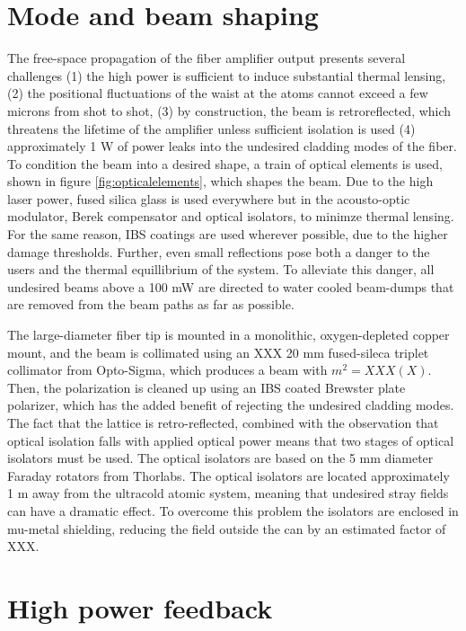 \documentclass[twocolumn,aps,pra,showpacs,preprintnumbers,bibnotes]{revtex4-1}
\begin{document}
\section{Mode and beam shaping}
The free-space propagation of the fiber amplifier output presents several challenges (1) the high power is sufficient to induce substantial thermal lensing, (2) the positional fluctuations of the waist at the atoms cannot exceed 
a few microns from shot to shot, (3) by construction, the beam is retroreflected, which threatens the lifetime of the amplifier unless sufficient isolation is used (4) approximately 1 W of power leaks into the undesired cladding modes of the fiber. 
To condition the beam into a desired shape, a train of optical elements is used, shown in figure \ref{fig:opticalelements}, which shapes the beam. 
Due to the high laser power, fused silica glass is used everywhere but in the acousto-optic modulator, Berek compensator and optical isolators, to minimze thermal lensing.
For the same reason, IBS coatings are used wherever possible, due to the higher damage thresholds.
Further, even small reflections pose both a danger to the users and the thermal equillibrium of the system.
To alleviate this danger, all undesired beams above a 100 mW are directed to water cooled beam-dumps that are removed from the beam paths as far as possible.

The large-diameter fiber tip is mounted in a monolithic, oxygen-depleted copper mount, and the beam is collimated using an XXX 20 mm fused-sileca triplet collimator from Opto-Sigma, which produces a beam with $m^2 = XXX(X)$.
Then, the polarization is cleaned up using an IBS coated Brewster plate polarizer, which has the added benefit of rejecting the undesired cladding modes. 
The fact that the lattice is retro-reflected, combined with the observation that optical isolation falls with applied optical power\cite{LIGO} means that two stages of optical isolators must be used. The optical isolators are based on the 5 mm diameter Faraday rotators from Thorlabs. 
The optical isolators are located approximately 1 m away from the ultracold atomic system, meaning that undesired stray fields can have a dramatic effect.
To overcome this problem the isolators are enclosed in mu-metal shielding, reducing the field outside the can by an estimated factor of XXX.

\section{High power feedback}
\end{document}
